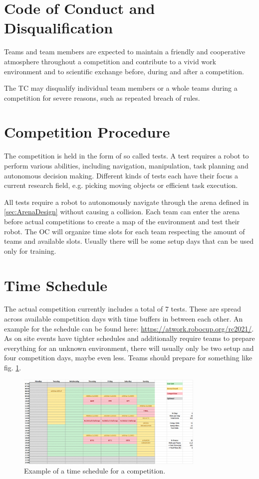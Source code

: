 \section{Code of Conduct and Disqualification}
Teams and team members are expected to maintain a friendly and cooperative atmosphere throughout a competition and contribute to a vivid work environment and to scientific exchange before, during and after a competition.
\par
The TC may disqualify individual team members or a whole teams during a competition for severe reasons, such as repeated breach of rules.


\section{Competition Procedure}

The competition is held in the form of so called tests.
A test requires a robot to perform various abilities, including navigation, manipulation, task planning and autonomous decision making.
Different kinds of tests each have their focus a current research field, e.g. picking moving objects or efficient task execution.

All tests require a robot to autonomously navigate through the arena defined in \ref{sec:ArenaDesign} without causing a collision. Each team can enter the arena before actual competitions to create a map of the environment and test their robot. The OC will organize time slots for each team respecting the amount of teams and available slots. Usually there will be some setup days that can be used only for training.

\section{Time Schedule}

The actual competition currently includes a total of 7 tests.
These are spread across available competition days with time buffers in between each other.
An example for the schedule can be found here: \url{https://atwork.robocup.org/rc2021/}.
As on site events have tighter schedules and additionally require teams to prepare everything for an unknown environment, there will usually only be two setup and four competition days, maybe even less.
Teams should prepare for something like fig. \ref{fig:example_schedule}. 

\begin{figure}[h!]
\centering
\includegraphics[width= 0.8\textwidth ]{./images/competition/example_schedule}
\caption{Example of a time schedule for a \RCAW competition.}
\label{fig:example_schedule}
\end{figure}



